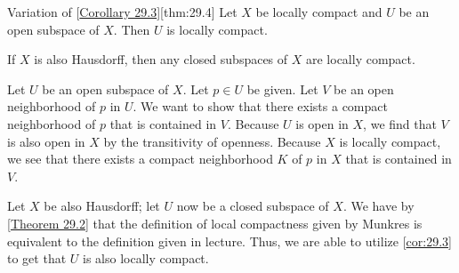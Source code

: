 \begin{thmBox}{Variation of [\hyperlink{cor:29.3}{Corollary 29.3}]}[thm:29.4]
    Let \( X \) be locally compact and \( U \) be an open subspace of 
    \( X \).
    Then \( U \) is locally compact.

    \baseSkip 

    If \( X \) is also Hausdorff, then any closed subspaces of \( X \) are locally 
    compact.

    \baseRule

    \begin{proofBox}
        Let \( U \) be an open subspace of \( X \).
        Let \( p \in U \) be given.
        Let \( V \) be an open neighborhood of \( p \) in \( U \).
        We want to show that there exists a compact neighborhood of \( p \)
        that is contained in \( V \).
        Because \( U \) is open in \( X \), we find that \( V \) is also
        open in \( X \) by the transitivity of openness.
        Because \( X \) is locally compact, we see that there exists a compact
        neighborhood \( K \) of \( p \) in \( X \) that is contained in 
        \( V \).

        \baseSkip

        Let \( X \) be also Hausdorff; let \( U \) now be a closed subspace of \( X \).
        We have by [\hyperlink{thm:29.2}{Theorem 29.2}] that the definition of 
        local compactness given by Munkres is equivalent to the definition given in 
        lecture. 
        Thus, we are able to utilize [\hyperlink{cor:29.3}{cor:29.3}] to get that 
        \( U \) is also locally compact. 
    \end{proofBox}
\end{thmBox}

